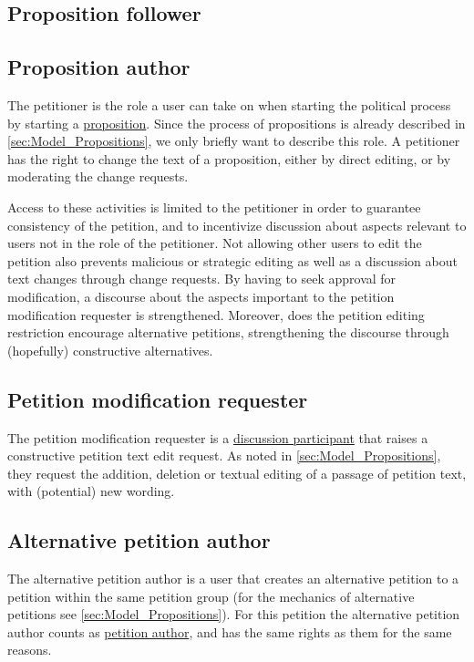 \subsection{Proposition follower}

\subsection{Proposition author}
\label{ssec:Roles_Petitioner}
The petitioner is the role a user can take on when starting the political process by starting a \href{ssec:Model_Propositions}{proposition}. Since the process of propositions is already described in \ref{sec:Model_Propositions}, we only briefly want to describe this role. A petitioner has the right to change the text of a proposition, either by direct editing, or by moderating the change requests. 

Access to these activities is limited to the petitioner in order to guarantee consistency of the petition, and to incentivize discussion about aspects relevant to users not in the role of the petitioner. Not allowing other users to edit the petition also prevents malicious or strategic editing as well as a discussion about text changes through change requests. By having to seek approval for modification, a discourse about the aspects important to the petition modification requester is strengthened.
Moreover, does the petition editing restriction encourage alternative petitions, strengthening the discourse through (hopefully) constructive alternatives.

\subsection{Petition modification requester}
The petition modification requester is a \href{sssec:Roles_DiscussionParticipant}{discussion participant} that raises a constructive petition text edit request. 
As noted in \ref{sec:Model_Propositions}, they request the addition, deletion or textual editing of a passage of petition text, with (potential) new wording. 

\subsection{Alternative petition author}
The alternative petition author is a user that creates an alternative petition to a petition within the same petition group (for the mechanics of alternative petitions see \ref{sec:Model_Propositions}). For this petition the alternative petition author counts as \href{sssec:Roles_Petitioner}{petition author}, and has the same rights as them for the same reasons.

